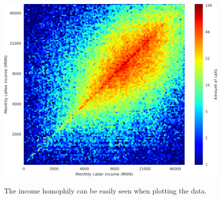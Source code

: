 \documentclass{beamer}
\begin{document}
\begin{frame}

\begin{figure}[h]
	\begin{center}
		{\includegraphics[height=0.8\textheight]
		{Homophily_income_origin_target_1.png}
		}\label{homophily_heatmap}
	\end{center}
	\caption{The income homophily can be easily seen when plotting the data.}
\end{figure}

\end{frame}
\end{document}
